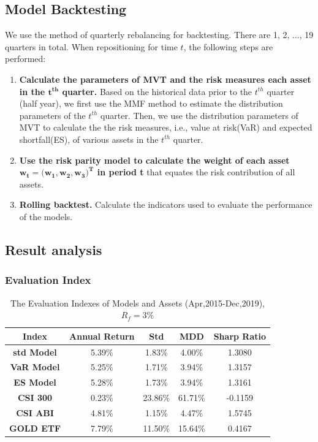 \subsection{Model Backtesting}
We use the method of quarterly rebalancing for backtesting. There are 1, 2, ..., 19 quarters in total. When repositioning for time $t$, the following steps are performed:
\begin{enumerate}
    \item \textbf{Calculate the parameters of MVT and the risk measures each asset in the $\boldsymbol t^{\boldsymbol t\boldsymbol h}$ quarter.} Based on the historical data prior to the $t^{th}$ quarter (half year), we first use the MMF method to estimate the distribution parameters of the $t^{th}$ quarter. Then, we use the distribution parameters of MVT to calculate the the risk measures, i.e., value at risk(VaR) and expected shortfall(ES), of various assets in the $t^{th}$ quarter.
    \item \textbf{Use the risk parity model to calculate the weight of each asset $\boldsymbol w_{\boldsymbol t} \boldsymbol = \boldsymbol (\boldsymbol w_{\boldsymbol 1}, \boldsymbol w_{\boldsymbol 2}, \boldsymbol w_{\boldsymbol 3}\boldsymbol )^{\boldsymbol T}$ in period t} that equates the risk contribution of all assets.
    \item \textbf{Rolling backtest.} Calculate the indicators used to evaluate the performance of the models.
\end{enumerate}

\subsection{Result analysis}
\subsubsection{Evaluation Index}
\begin{table}[H]
    \centering
   \begin{tabular}{|c|c|c|c|c|}
    \hline
    {\bf Index} & {\bf Annual Return} &  {\bf Std} &  {\bf MDD} & {\bf Sharp Ratio}  \\
    \hline
    {\bf std Model} &     5.39\% &     1.83\% &     4.00\% &    1.3080    \\
    \hline
    {\bf VaR Model} &     5.25\% &     1.71\% &     3.94\% &    1.3157   \\
    \hline
    {\bf ES Model} &     5.28\% &     1.73\% &     3.94\% &    1.3161   \\
    \hline
    {\bf CSI 300} &     0.23\% &    23.86\% &    61.71\% &   -0.1159    \\
    \hline
    {\bf CSI ABI} &     4.81\% &     1.15\% &     4.47\% &    1.5745   \\
    \hline
    {\bf GOLD ETF} &     7.79\% &    11.50\% &    15.64\% &    0.4167  \\
    \hline
    \end{tabular}  
    \caption{The Evaluation Indexes of Models and Assets (Apr,2015-Dec,2019),$R_f=3\%$}
    \label{Tab3}
\end{table}

